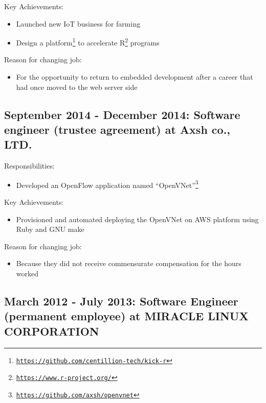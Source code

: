 \documentclass[letterpaper]{article}
\begin{document}
\noindent Key Achievements:

\begin{itemize}
  \item Launched new IoT business for farming
  \item Design a platform\footnote{\href{https://github.com/centillion-tech/kick-r}{\tt https://github.com/centillion-tech/kick-r}} to accelerate R\footnote{\href{https://www.r-project.org/}{\tt https://www.r-project.org/}} programs
\end{itemize}

\noindent Reason for changing job:

\begin{itemize}
  \item For the opportunity to return to embedded development after a career that had once moved to the web server side
\end{itemize}

\subsection*{September 2014 - December 2014: Software engineer (trustee agreement) at Axsh co., LTD.}

\noindent Responsibilities:

\begin{itemize}
  \item Developed an OpenFlow application named ``OpenVNet''\footnote{\href{https://github.com/axsh/openvnet}{\tt https://github.com/axsh/openvnet}}
\end{itemize}

\noindent Key Achievements:

\begin{itemize}
  \item Provisioned and automated deploying the OpenVNet on AWS platform using Ruby and GNU make
\end{itemize}

\noindent Reason for changing job:

\begin{itemize}
  \item Because they did not receive commensurate compensation for the hours worked
\end{itemize}

\subsection*{March 2012 - July 2013: Software Engineer (permanent employee) at MIRACLE LINUX CORPORATION}
\end{document}
